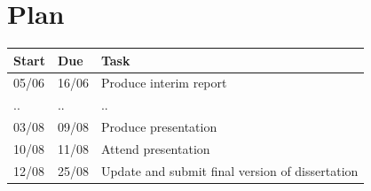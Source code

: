 \documentclass{llncs}
\begin{document}
%
%

\section{Plan}

\begin{tabular}{ p{} p{} p{} }
	Start & Due & Task \\
	\hline
	05/06 & 16/06 & Produce interim report \\
	.. & .. & .. \\
	03/08 & 09/08 & Produce presentation \\
	10/08 & 11/08 & Attend presentation \\
	12/08 & 25/08 & Update and submit final version of dissertation \\
\end{tabular}

%
%



\end{document}
